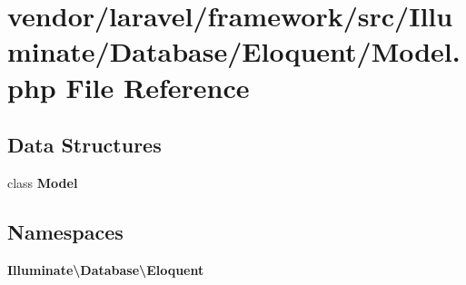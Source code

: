 \section{vendor/laravel/framework/src/\+Illuminate/\+Database/\+Eloquent/\+Model.php File Reference}
\label{_model_8php}
\subsection*{Data Structures}
\begin{DoxyCompactItemize}
\item 
class {\bf Model}
\end{DoxyCompactItemize}
\subsection*{Namespaces}
\begin{DoxyCompactItemize}
\item 
 {\bf Illuminate\textbackslash{}\+Database\textbackslash{}\+Eloquent}
\end{DoxyCompactItemize}
